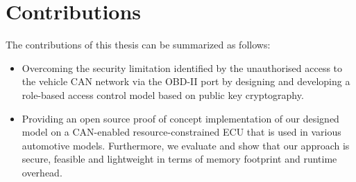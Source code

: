 \section{Contributions}
\label{sec:contributions}

The contributions of this thesis can be summarized as follows:

\begin{itemize}
	\item Overcoming the security limitation identified by the unauthorised access to the vehicle CAN network via the OBD-II port by designing and developing a role-based access control model based on public key cryptography.
	
	\item Providing an open source proof of concept implementation of our designed model on a CAN-enabled resource-constrained ECU that is used in various automotive models. Furthermore, we evaluate and show that our approach is secure, feasible and lightweight in terms of memory footprint and runtime overhead.
\end{itemize} 

